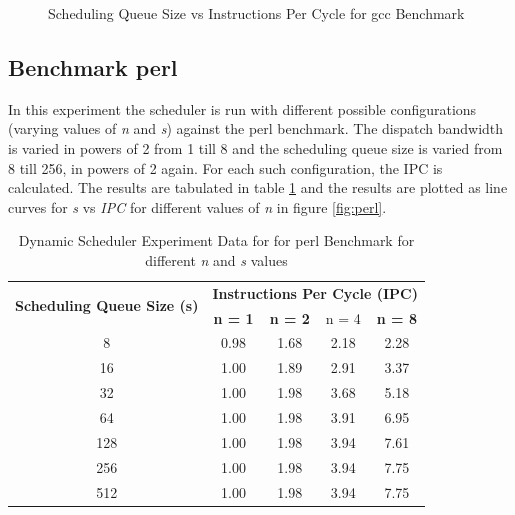 \begin{figure} [htbp]
    \centering
    \caption{Scheduling Queue Size vs Instructions Per Cycle for gcc Benchmark}
    \label{fig:gcc}
\end{figure}


\subsection{Benchmark perl}
In this experiment the scheduler is run with different possible configurations (varying values of \textit{n} and \textit{s}) against the perl benchmark. The dispatch bandwidth is varied in powers of 2 from 1 till 8 and the scheduling queue size is varied from 8 till 256, in powers of 2 again. For each such configuration, the IPC is calculated. The results are tabulated in table \ref{tab:perl} and the results are plotted as line curves for \textit{s} vs \textit{IPC} for different values of \textit{n} in figure \ref{fig:perl}.

\begin{table}[htbp]
    \centering
    \noindent \begin{tabular}{|c|c|c|c|c|}
        \hline
        \multirow{2}[4]{*}{\bf Scheduling Queue Size (s) } & \multicolumn{4}{c|}{\bf Instructions Per Cycle (IPC)} \\
        \cline{2-5} & \bf n = 1 & \bf n = 2 & n = 4 & \bf n = 8 \\
        \hline
          8 & 0.98 & 1.68 & 2.18 & 2.28 \\
         16 & 1.00 & 1.89 & 2.91 & 3.37 \\
         32 & 1.00 & 1.98 & 3.68 & 5.18 \\
         64 & 1.00 & 1.98 & 3.91 & 6.95 \\
        128 & 1.00 & 1.98 & 3.94 & 7.61 \\
        256 & 1.00 & 1.98 & 3.94 & 7.75 \\
        512 & 1.00 & 1.98 & 3.94 & 7.75 \\
        \hline
    \end{tabular}
    \captionsetup{justification=centering}
    \caption{Dynamic Scheduler Experiment Data for for perl Benchmark for different \textit{n} and \textit{s} values}
    \label{tab:perl}
\end{table}

